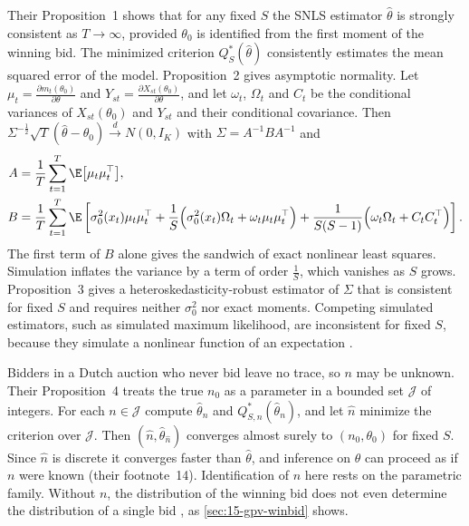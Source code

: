 Their Proposition~1 shows that for any fixed $S$ the SNLS estimator $\hat\theta$ is strongly consistent as $T\to\infty$,
provided $\theta_0$ is identified from the first moment of the winning bid. The minimized criterion $Q_S^*(\hat\theta)$
consistently estimates the mean squared error of the model. Proposition~2 gives asymptotic normality. Let
$\mu_t=\frac{\partial m_t(\theta_0)}{\partial\theta}$ and $Y_{st}=\frac{\partial X_{st}(\theta_0)}{\partial\theta}$, and let $\omega_t$,
$\Omega_t$ and $C_t$ be the conditional variances of $X_{st}(\theta_0)$ and $Y_{st}$ and their conditional covariance. Then
$\Sigma^{-\frac12}\sqrt T(\hat\theta-\theta_0)\xrightarrow{d}N(0,I_K)$ with $\Sigma=A^{-1}BA^{-1}$ and
\begin{align*}
A&=\frac1T\sum_{t=1}^T\E\big[\mu_t\mu_t^\top\big],\\
B&=\frac1T\sum_{t=1}^T\E\left[\sigma_0^2(x_t)\mu_t\mu_t^\top+\frac1S\Big(\sigma_0^2(x_t)\Omega_t+\omega_t\mu_t\mu_t^\top\Big)
+\frac{1}{S(S-1)}\Big(\omega_t\Omega_t+C_tC_t^\top\Big)\right].
\end{align*}
The first term of $B$ alone gives the sandwich of exact nonlinear least squares. Simulation inflates the variance by a
term of order $\frac1S$, which vanishes as $S$ grows. Proposition~3 gives a heteroskedasticity-robust estimator of
$\Sigma$ that is consistent for fixed $S$ and requires neither $\sigma_0^2$ nor exact moments. Competing simulated
estimators, such as simulated maximum likelihood, are inconsistent for fixed $S$, because they simulate a nonlinear
function of an expectation \citep[p.~962]{LaffontOssardVuong1995}.

Bidders in a Dutch auction who never bid leave no trace, so $n$ may be unknown. Their Proposition~4 treats the true
$n_0$ as a parameter in a bounded set $\mathcal J$ of integers. For each $n\in\mathcal J$ compute $\hat\theta_n$ and
$Q^*_{S,n}(\hat\theta_n)$, and let $\hat n$ minimize the criterion over $\mathcal J$. Then $(\hat n,\hat\theta_{\hat n})$ converges almost
surely to $(n_0,\theta_0)$ for fixed $S$. Since $\hat n$ is discrete it converges faster than $\hat\theta$, and inference on
$\theta$ can proceed as if $n$ were known (their footnote~14). Identification of $n$ here rests on the parametric
family. Without $n$, the distribution of the winning bid does not even determine the distribution of a single bid
\citep[Section~3.3.1]{AtheyHaile2007}, as \cref{sec:15-gpv-winbid} shows.

